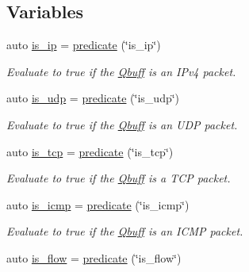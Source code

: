 \subsection*{Variables}
\begin{DoxyCompactItemize}
\item 
auto \hyperlink{namespacepfq_1_1lang_1_1anonymous__namespace_02default_8hpp_03_aa97a34e12e4c6bc2d85a5c169800cfa4}{is\+\_\+ip} = \hyperlink{namespacepfq_1_1lang_aca9adafc436b7f851621b979fa1aaf88}{predicate} (\char`\"{}is\+\_\+ip\char`\"{})
\begin{DoxyCompactList}\small\item\em Evaluate to {\ttfamily true} if the \hyperlink{structpfq_1_1lang_1_1Qbuff}{Qbuff} is an I\+Pv4 packet. \end{DoxyCompactList}\item 
auto \hyperlink{namespacepfq_1_1lang_1_1anonymous__namespace_02default_8hpp_03_a42701f36d9dde7f3636b90244d520a16}{is\+\_\+udp} = \hyperlink{namespacepfq_1_1lang_aca9adafc436b7f851621b979fa1aaf88}{predicate} (\char`\"{}is\+\_\+udp\char`\"{})
\begin{DoxyCompactList}\small\item\em Evaluate to {\ttfamily true} if the \hyperlink{structpfq_1_1lang_1_1Qbuff}{Qbuff} is an U\+DP packet. \end{DoxyCompactList}\item 
auto \hyperlink{namespacepfq_1_1lang_1_1anonymous__namespace_02default_8hpp_03_a67fe3072aa5353c1526aa04320d40137}{is\+\_\+tcp} = \hyperlink{namespacepfq_1_1lang_aca9adafc436b7f851621b979fa1aaf88}{predicate} (\char`\"{}is\+\_\+tcp\char`\"{})
\begin{DoxyCompactList}\small\item\em Evaluate to {\ttfamily true} if the \hyperlink{structpfq_1_1lang_1_1Qbuff}{Qbuff} is a T\+CP packet. \end{DoxyCompactList}\item 
auto \hyperlink{namespacepfq_1_1lang_1_1anonymous__namespace_02default_8hpp_03_a01ccba89c8582ba423393226b54f12de}{is\+\_\+icmp} = \hyperlink{namespacepfq_1_1lang_aca9adafc436b7f851621b979fa1aaf88}{predicate} (\char`\"{}is\+\_\+icmp\char`\"{})
\begin{DoxyCompactList}\small\item\em Evaluate to {\ttfamily true} if the \hyperlink{structpfq_1_1lang_1_1Qbuff}{Qbuff} is an I\+C\+MP packet. \end{DoxyCompactList}\item 
auto \hyperlink{namespacepfq_1_1lang_1_1anonymous__namespace_02default_8hpp_03_ae52890434121a999589d48bccae3c3e2}{is\+\_\+flow} = \hyperlink{namespacepfq_1_1lang_aca9adafc436b7f851621b979fa1aaf88}{predicate} (\char`\"{}is\+\_\+flow\char`\"{})

\end{DoxyCompactItemize}

